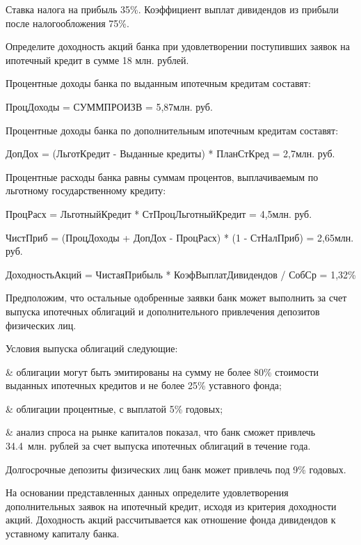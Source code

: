 \documentclass[12pt, table, a4paper,twoside]{exam}
\begin{document}
\begin{questions}
Ставка налога на прибыль	35\%.
Коэффициент выплат дивидендов из прибыли после налогообложения	75\%.

\noaddpoints

\begin{subparts}
	\subpart[10]  Определите доходность акций банка при удовлетворении поступивших заявок на ипотечный кредит в сумме 18 млн. рублей.
	
	\begin{solution}[12em]
		
		Процентные доходы банка по выданным ипотечным кредитам составят:
		
		ПроцДоходы = СУММПРОИЗВ = 5,87млн. руб.
		
		Процентные доходы банка по дополнительным ипотечным кредитам составят:
		
		ДопДох = (ЛьготКредит - Выданные кредиты) * ПланСтКред = 2,7млн. руб.
		
		Процентные расходы банка равны суммам процентов, выплачиваемым по льготному государственному кредиту:
		
		ПроцРасх = ЛьготныйКредит * СтПроцЛьготныйКредит = 4,5млн. руб. 
		
		ЧистПриб = (ПроцДоходы + ДопДох - ПроцРасх) * (1 - СтНалПриб) = 2,65млн. руб.
		
		ДоходностьАкций = ЧистаяПрибыль * КоэфВыплатДивидендов / СобСр = 1,32\%
		
	\end{solution}
	
	\subpart[10] Предположим, что остальные одобренные заявки банк может выполнить за счет выпуска ипотечных облигаций и дополнительного привлечения депозитов физических лиц. 
	
	Условия выпуска облигаций следующие:
	\begin{easylist}[itemize]	
	& облигации могут быть эмитированы на сумму не более 80\% стоимости выданных ипотечных кредитов и не более 25\% уставного фонда;
	
	& облигации процентные, с выплатой 5\% годовых;
	
	& анализ спроса на рынке капиталов показал, что банк сможет привлечь 34.4~млн. рублей за счет выпуска ипотечных облигаций в течение года.
	\end{easylist}
	Долгосрочные депозиты физических лиц банк может привлечь под 9\% годовых.
	
	На основании представленных данных определите удовлетворения дополнительных заявок на ипотечный кредит, исходя из критерия доходности акций.
	Доходность акций рассчитывается как отношение фонда дивидендов к уставному капиталу банка. 
	

\end{subparts}
\end{questions}
\end{document}
